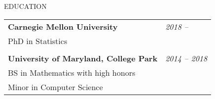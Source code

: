 \documentclass{resume} %
\begin{document}

\begin{rSection}{EDUCATION}

\begin{tabular}{p{14cm}R{2.5cm}}
	\bf{Carnegie Mellon University}  &  \it{2018 -- }  \\ 
	PhD in Statistics &  \\ & \\
	\textbf{University of Maryland, College Park} & \it{2014 -- 2018}
	 \\  BS in Mathematics with high honors & \\
	 Minor in Computer Science
\end{tabular} 
\end{rSection}





\end{document}
